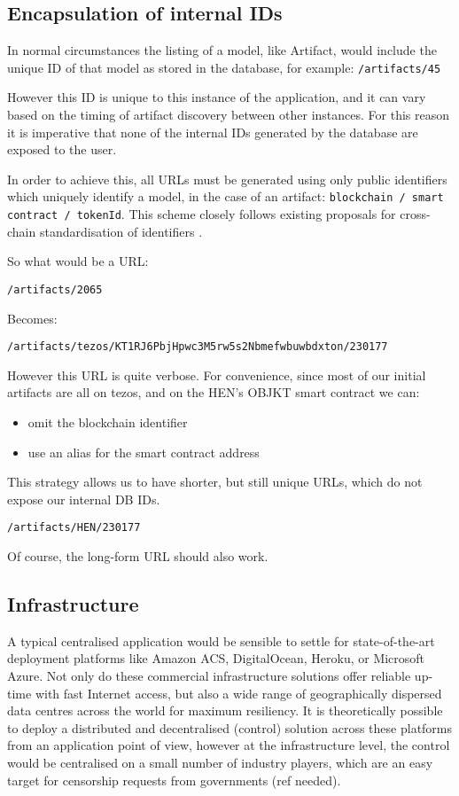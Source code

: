 \subsection{Encapsulation of internal IDs}

In normal circumstances the listing of a model, like Artifact, would include the unique ID of that model as stored in the database, for example: \texttt{/artifacts/45}

However this ID is unique to this instance of the application, and it can vary based on the timing of artifact discovery between other instances.
For this reason it is imperative that none of the internal IDs generated by the database are exposed to the user.

In order to achieve this, all URLs must be generated using only public identifiers which uniquely identify a model, in the case of an artifact: \texttt{blockchain /  smart contract / tokenId}.
This scheme closely follows existing proposals for cross-chain standardisation of identifiers \cite{herzogAssetTypeAsset2020}.

So what would be a URL:

\texttt{/artifacts/2065}

Becomes:

\texttt{/artifacts/tezos/KT1RJ6PbjHpwc3M5rw5s2Nbmefwbuwbdxton/230177}


However this URL is quite verbose. For convenience, since most of our initial artifacts are all on tezos, and on the HEN's OBJKT smart contract we can:

\begin{itemize}
    \item omit the blockchain identifier
    \item use an alias for the smart contract address
\end{itemize}

This strategy allows us to have shorter, but still unique URLs, which do not expose our internal DB IDs.

\texttt{/artifacts/HEN/230177}

Of course, the long-form URL should also work.

\subsection{Infrastructure}

A typical centralised application would be sensible to settle for state-of-the-art deployment platforms like Amazon ACS, DigitalOcean, Heroku, or Microsoft Azure. Not only do these commercial infrastructure solutions offer reliable up-time with fast Internet access, but also a wide range of geographically dispersed data centres across the world for maximum resiliency. It is theoretically possible to deploy a distributed and decentralised (control) solution across these platforms from an application point of view, however at the infrastructure level, the control would be centralised on a small number of industry players, which are an easy target for censorship requests from governments (ref needed).

